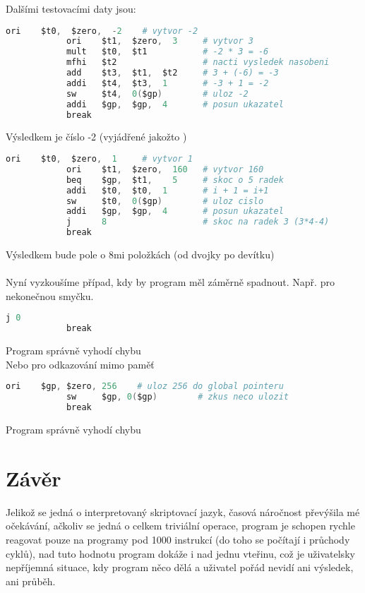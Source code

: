 \documentclass[a4paper,titlepage]{article}
\begin{document}
		Dalšími testovacími daty jsou:
		\begin{lstlisting}[language=Assembler]
			ori    $t0,  $zero,  -2    # vytvor -2
			ori    $t1,  $zero,  3     # vytvor 3
			mult   $t0,  $t1           # -2 * 3 = -6
			mfhi   $t2                 # nacti vysledek nasobeni
			add    $t3,  $t1,  $t2     # 3 + (-6) = -3
			addi   $t4,  $t3,  1       # -3 + 1 = -2
			sw     $t4,  0($gp)        # uloz -2
			addi   $gp,  $gp,  4       # posun ukazatel
			break
		\end{lstlisting}
		Výsledkem je číslo -2 (vyjádřené jakožto )\\
		
		\begin{lstlisting}[language=Assembler]
			ori    $t0,  $zero,  1     # vytvor 1
			ori    $t1,  $zero,  160   # vytvor 160
			beq    $gp,  $t1,    5     # skoc o 5 radek
			addi   $t0,  $t0,  1       # i + 1 = i+1
			sw     $t0,  0($gp)        # uloz cislo
			addi   $gp,  $gp,  4       # posun ukazatel
			j      8                   # skoc na radek 3 (3*4-4)
			break
		\end{lstlisting}
		Výsledkem bude pole o 8mi položkách (od dvojky po devítku)\\
		\\
		Nyní vyzkoušíme případ, kdy by program měl záměrně spadnout.
		Např. pro nekonečnou smyčku.
		\begin{lstlisting}[language=Assembler]
			j 0
			break
		\end{lstlisting}
		Program správně vyhodí chybu\\
		Nebo pro odkazování mimo paměť
		\begin{lstlisting}[language=Assembler]
			ori    $gp, $zero, 256    # uloz 256 do global pointeru
			sw     $gp, 0($gp)        # zkus neco ulozit
			break
		\end{lstlisting}
		Program správně vyhodí chybu\\


\section{Závěr}
	\noindent Jelikož se jedná o interpretovaný skriptovací jazyk, časová náročnost převýšila mé očekávání, ačkoliv se jedná o celkem triviální operace,
	program je schopen rychle reagovat pouze na programy pod 1000 instrukcí (do toho se počítají i průchody cyklů),
	nad tuto hodnotu program dokáže  i nad jednu vteřinu, což je uživatelsky nepříjemná situace,
	kdy program něco dělá a uživatel pořád nevidí ani výsledek, ani průběh.\\
\end{document}
